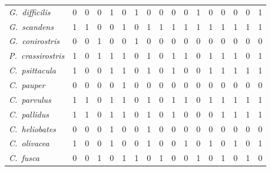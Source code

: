 \documentclass[11pt]{article}
\begin{document}
\begin{landscape}
{\begin{longtable}[l]{>{\em}lllllllllllllllll}
G.~difficilis & 0 & 0 & 0 & 1 & 0 & 1 & 0 & 0 & 0 & 0 & 1 & 0 & 0 & 0 & 0 & 1\tabularnewline
G.~scandens & 1 & 1 & 0 & 0 & 1 & 0 & 1 & 1 & 1 & 1 & 1 & 1 & 1 & 1 & 1 & 1\tabularnewline
G.~conirostris & 0 & 0 & 1 & 0 & 0 & 1 & 0 & 0 & 0 & 0 & 0 & 0 & 0 & 0 & 0 & 0\tabularnewline
P.~crassirostris & 1 & 0 & 1 & 1 & 1 & 0 & 1 & 0 & 1 & 1 & 0 & 1 & 1 & 1 & 0 & 1\tabularnewline
C.~psittacula & 1 & 0 & 0 & 1 & 1 & 0 & 1 & 0 & 1 & 0 & 0 & 1 & 1 & 1 & 1 & 1\tabularnewline
C.~pauper & 0 & 0 & 0 & 0 & 1 & 0 & 0 & 0 & 0 & 0 & 0 & 0 & 0 & 0 & 0 & 0\tabularnewline
C.~parvulus & 1 & 1 & 0 & 1 & 1 & 0 & 1 & 0 & 1 & 1 & 0 & 1 & 1 & 1 & 1 & 1\tabularnewline
C.~pallidus & 1 & 1 & 0 & 1 & 1 & 0 & 1 & 0 & 1 & 0 & 0 & 0 & 1 & 1 & 1 & 1\tabularnewline
C.~heliobates & 0 & 0 & 0 & 1 & 0 & 0 & 1 & 0 & 0 & 0 & 0 & 0 & 0 & 0 & 0 & 0\tabularnewline
C.~olivacea & 1 & 0 & 0 & 1 & 0 & 0 & 1 & 0 & 0 & 1 & 0 & 1 & 0 & 1 & 0 & 1\tabularnewline
C.~fusca & 0 & 0 & 1 & 0 & 1 & 1 & 0 & 1 & 0 & 0 & 1 & 0 & 1 & 0 & 1 & 0\tabularnewline
\bottomrule
\end{longtable}
}

\end{landscape}

\newpage
\end{document}

